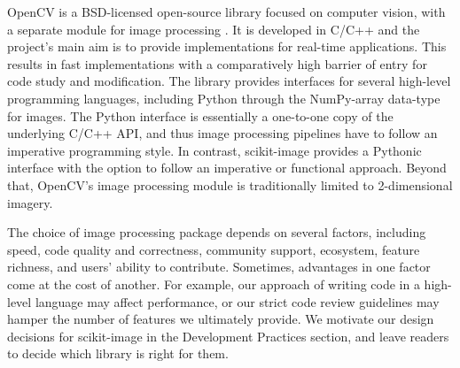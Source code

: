   OpenCV is a BSD-licensed open-source library focused on computer vision, with
  a separate module for image processing \citep{opencv}. It is
  developed in C/C++ and the project's main aim is to provide implementations for
  real-time applications. This results in fast implementations with a comparatively high
  barrier of entry for code study and modification. The library provides
  interfaces for several high-level programming languages, including Python
  through the NumPy-array data-type for images. The Python interface is
  essentially a one-to-one copy of the underlying C/C++ API, and thus image
  processing pipelines have to follow an imperative programming style. In
  contrast, scikit-image provides a Pythonic interface with the option
  to follow an imperative or functional approach. Beyond that, OpenCV's image
  processing module is traditionally limited to 2-dimensional imagery.

  The choice of image processing package depends on several factors, including
  speed, code quality and correctness, community support, ecosystem, feature
  richness, and users' ability to contribute. Sometimes, advantages in one
  factor come at the cost of another. For example, our approach of writing code
  in a high-level language may affect performance, or our strict code review
  guidelines may hamper the number of features we ultimately provide. We
  motivate our design decisions for scikit-image in the Development Practices
  section, and leave readers to decide which library is right for them.
